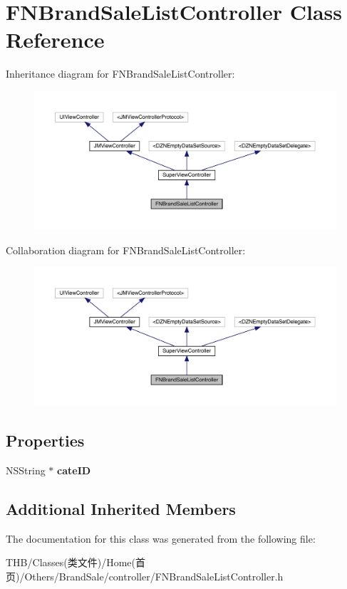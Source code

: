 \hypertarget{interface_f_n_brand_sale_list_controller}{}\section{F\+N\+Brand\+Sale\+List\+Controller Class Reference}
\label{interface_f_n_brand_sale_list_controller}


Inheritance diagram for F\+N\+Brand\+Sale\+List\+Controller\+:\nopagebreak
\begin{figure}[H]
\begin{center}
\leavevmode
\includegraphics[width=350pt]{interface_f_n_brand_sale_list_controller__inherit__graph}
\end{center}
\end{figure}


Collaboration diagram for F\+N\+Brand\+Sale\+List\+Controller\+:\nopagebreak
\begin{figure}[H]
\begin{center}
\leavevmode
\includegraphics[width=350pt]{interface_f_n_brand_sale_list_controller__coll__graph}
\end{center}
\end{figure}
\subsection*{Properties}
\begin{DoxyCompactItemize}
\item 
\mbox{\label{interface_f_n_brand_sale_list_controller_ae980d64a37b9bb8961b20747361197ad}} 
N\+S\+String $\ast$ {\bfseries cate\+ID}
\end{DoxyCompactItemize}
\subsection*{Additional Inherited Members}


The documentation for this class was generated from the following file\+:\begin{DoxyCompactItemize}
\item 
T\+H\+B/\+Classes(类文件)/\+Home(首页)/\+Others/\+Brand\+Sale/controller/F\+N\+Brand\+Sale\+List\+Controller.\+h\end{DoxyCompactItemize}
